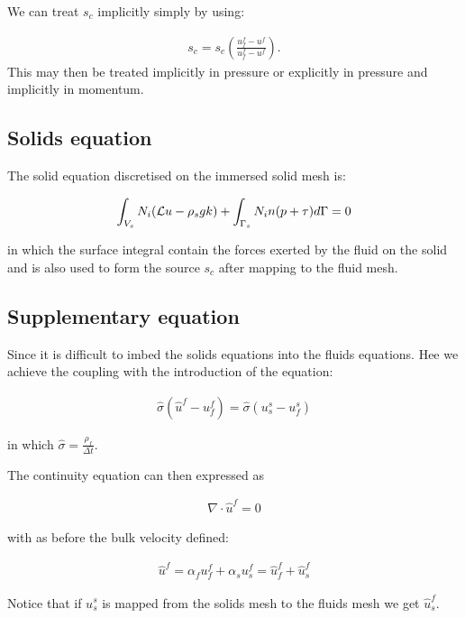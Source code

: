 We can treat $s_c$ implicitly simply by using:

\begin{eqnarray}
s_c= s_c \left( \frac{u^f_f - u^f}{u^f_f - u^f}\right). 
\label{imp-s-c}
\end{eqnarray} 
This may then be treated implicitly in pressure or 
explicitly in pressure and implicitly in momentum. 



\subsection{Solids equation} 
The solid equation discretised 
on the immersed solid mesh is:


\begin{eqnarray}
\int_{V_s} N_i ({\cal L} u - \rho_s g k)
+\int_{\Gamma_s} N_i n (p+\tau)d\Gamma=0
\label{solids-forced}
\end{eqnarray}

in which the surface integral contain the forces 
exerted by the fluid on the solid and is also 
used to form the source $s_c$ after mapping to the fluid mesh. 

\subsection{Supplementary equation}
Since it is difficult to imbed the solids equations into 
the fluids equations. Hee we achieve the coupling with the 
introduction of the equation:

\begin{eqnarray}
\hat\sigma (\hat u^f - u_f^f) = \hat\sigma( u_s^s-u_f^s)
\label{sigma-hat-eqn}
\end{eqnarray}

in which $\hat\sigma=\frac{\rho_f}{\Delta t}$. 

The continuity equation can then expressed as 

\begin{eqnarray}
\nabla \cdot \hat u^f=0
\end{eqnarray}

with as before the bulk velocity defined:

\begin{eqnarray}
\hat u^f=\alpha_f u_f^f + \alpha_s u_s^f= \hat u_f^f + \hat u_s^f
\end{eqnarray}

Notice that if $u_s^s$ is mapped from the solids mesh to 
the fluids mesh we get $\hat u_s^f$. 

